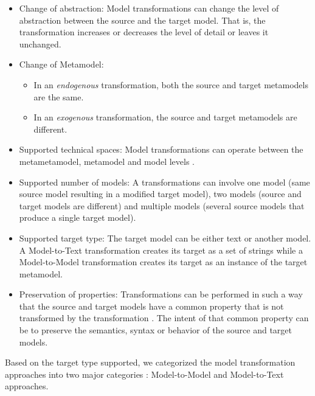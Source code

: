 \begin{itemize}

\item Change of abstraction: Model transformations can change the level of abstraction between the source and the target model. That is, the transformation increases or decreases the level of detail or leaves it unchanged.

\item Change of Metamodel: 
	\begin{itemize}
		\item In an \textit{endogenous} \cite{Visser2005} transformation, both the source and target metamodels are the same.
		\item In an \textit{exogenous} \cite{Visser2005} transformation,  the source and target metamodels are 			different.
	\end{itemize}
\item Supported technical spaces: Model transformations can operate between the metametamodel, metamodel and model levels \cite{OOPSLA2004Bezivin}. 

\item Supported number of models: A transformations can involve one model (same source model resulting in a modified target model), two models (source and target models are different) and multiple models (several source models that produce a single target model).

\item Supported target type: The target model can be either text or another model. A Model-to-Text transformation creates its target as a set of strings while a  Model-to-Model transformation creates its target as an instance of the target metamodel.

\item Preservation of properties: Transformations can be performed in such a way that the source and target models have a common property that is not transformed by the transformation \cite{biehl2010literature}. The intent of that common property can be to preserve the semantics, syntax or behavior of the source and target models. 
\end{itemize}

Based on the target type supported, we categorized the model transformation approaches into two major categories \cite{Czarnecki2006}: Model-to-Model and Model-to-Text approaches. 


